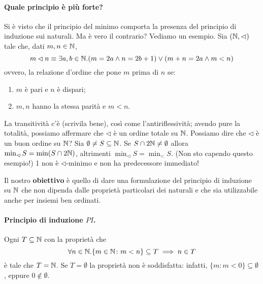 \paragraph{Quale principio è più forte?} Si è visto che il principio del minimo comporta la presenza del principio di induzione sui naturali. Ma è vero il contrario? Vediamo un esempio. Sia \((\mathbb{N}, \lhd)\) tale che, dati \(m, n \in \mathbb{N}\),
\[
m \lhd n\equiv \exists a,b \in \mathbb{N}. (m = 2a \land n = 2b+1) \lor (m + n = 2a \land m < n)
\]
ovvero, la relazione d'ordine che pone \(m\) prima di \(n\) se:
\begin{enumerate}
  \item \(m\) è pari e \(n\) è dispari;
  \item \(m,n\) hanno la stessa parità e \(m < n\).
\end{enumerate}
La transitività c'è (scrivila bene), così come l'antiriflessività; avendo pure la totalità, possiamo affermare che \(\lhd\) è un ordine totale su \(\mathbb{N}\). Possiamo dire che \(\lhd\) è un buon ordine su \(\mathbb{N}\)?
Sia \(\emptyset \neq S \subseteq \mathbb{N}\). Se \(S \cap 2\mathbb{N} \neq \emptyset\) allora \(\min_{\lhd} S = \min(S\cap2\mathbb{N})\), altrimenti \(\min_{\lhd} S = \min_{<} S\). (Non sto capendo questo esempio!) 1 non è \(\lhd\)-minimo e non ha predecessore immediato!

Il nostro {\bf obiettivo} è quello di dare una formulazione del principio di induzione su \(\mathbb{N}\) che non dipenda dalle proprietà particolari dei naturali e che sia utilizzabile anche per insiemi ben ordinati.

\paragraph{Principio di induzione \(PI\).} Ogni \(T \subseteq \mathbb{N}\) con la proprietà che
\begin{equation}
\forall n \in \mathbb{N}. \lbrace m \in \mathbb{N} \colon m < n\rbrace \subseteq T \implies n \in T \label{pro1}
\end{equation}
è tale che \(T = \mathbb{N}\). Se \(T = \emptyset\) la proprietà non è soddisfatta: infatti, \(\lbrace m \colon m < 0\rbrace \subseteq \emptyset\), eppure \(0 \notin \emptyset\).


